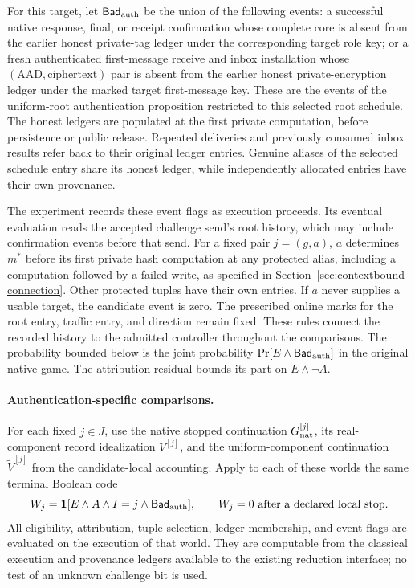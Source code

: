 For this target, let $\mathsf{Bad}_{\rm auth}$ be the union of the following
events: a successful native response, final, or receipt confirmation whose
complete core is absent from the earlier honest private-tag ledger under the
corresponding target role key; or a fresh authenticated first-message receive
and inbox installation whose $(\mathrm{AAD},\mathrm{ciphertext})$ pair is absent
from the earlier honest private-encryption ledger under the marked target
first-message key.  These are the events of the uniform-root authentication
proposition restricted to this selected root schedule.  The honest ledgers
are populated at the first private computation, before persistence or public
release.  Repeated deliveries and previously consumed inbox results refer
back to their original ledger entries.  Genuine aliases of the selected
schedule entry share its honest ledger, while independently allocated
entries have their own provenance.

The experiment records these event flags as execution proceeds.  Its eventual
evaluation reads the accepted challenge send's root history, which may
include confirmation events before that send.  For a fixed pair $j=(g,a)$,
$a$ determines $m^*$ before its first private hash computation
at any protected alias, including a computation followed by a failed write,
as specified in Section~\ref{sec:contextbound-connection}.  Other protected
tuples have their own entries.  If $a$ never supplies a usable
target, the candidate event is zero.  The prescribed online marks for the
root entry, traffic entry, and direction remain fixed.  These rules connect the
recorded history to the admitted controller throughout the comparisons.
The probability bounded below is the joint probability
$\Pr[E\wedge\mathsf{Bad}_{\rm auth}]$ in the original native game.  The
attribution residual bounds its part on $E\wedge\neg A$.

\paragraph{Authentication-specific comparisons.}
For each fixed $j\in J$, use the native stopped continuation
$G_{\rm nat}^{[j]}$, its real-component record idealization $V^{[j]}$, and the
uniform-component continuation $\widetilde V^{[j]}$ from the candidate-local
accounting.  Apply to each of these worlds the same terminal Boolean code
\[
 W_j=\mathbf1[
 E\wedge A\wedge I=j\wedge\mathsf{Bad}_{\rm auth}],
 \qquad W_j=0\text{ after a declared local stop}.
\]
All eligibility, attribution, tuple selection, ledger membership, and event
flags are evaluated on the execution of that world.  They are computable from
the classical execution and provenance ledgers available to the existing
reduction interface; no test of an unknown challenge bit is used.


